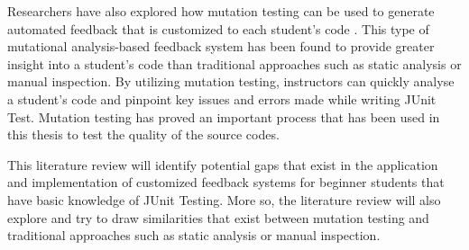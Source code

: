 Researchers have also explored how mutation testing can be used to generate automated feedback that is customized to each student's code \cite{ref16}. This type of mutational analysis-based feedback system has been found to provide greater insight into a student's code than traditional approaches such as static analysis or manual inspection. By utilizing mutation testing, instructors can quickly analyse a student's code and pinpoint key issues and errors made while writing JUnit Test. Mutation testing has proved an important process that has been used in this thesis to test the quality of the source codes. \par 
This literature review will identify potential gaps that exist in the application and implementation of customized feedback systems for beginner students that have basic knowledge of JUnit Testing. More so, the literature review will also explore and try to draw similarities that exist between mutation testing and traditional approaches such as static analysis or manual inspection.
